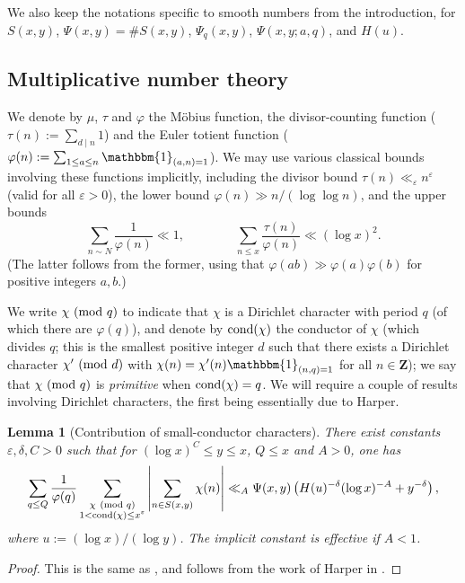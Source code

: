 \documentclass[reqno,11pt]{amsart}
\newtheorem{lemma}[theorem]{Lemma}
\theoremstyle{definition}
\theoremstyle{remark}
\numberwithin{equation}{section}
\newcommand{\Z}{\mathbf{Z}}
\newcommand{\one}{\mathbbm{1}}
\newcommand{\eps}{\varepsilon}
\newcommand{\cond}{\textnormal{cond}}
\renewcommand{\pmod}[1]{\ (\textnormal{mod } #1)}
\begin{document}
We also keep the notations specific to smooth numbers from the introduction, for $S(x, y)$, $\Psi(x, y) = \# S(x, y)$, $\Psi_q(x, y)$, $\Psi(x, y; a, q)$, and $H(u)$.


\subsection{Multiplicative number theory}

We denote by $\mu$, $\tau$ and $\varphi$ the M\"obius function, the divisor-counting function ($\tau(n) := \sum_{d \mid n} 1$) and the Euler totient function ($\varphi(n) := \sum_{1 \le a \le n} \one_{(a, n) = 1}$). We may use various classical bounds involving these functions implicitly, including the divisor bound $\tau(n) \ll_\eps n^\eps$ (valid for all $\eps > 0$), the lower bound $\varphi(n) \gg n/(\log \log n)$, and the upper bounds
\[
    \sum_{n \sim N} \frac{1}{\varphi(n)} \ll 1, \qquad\qquad 
    \sum_{n \le x} \frac{\tau(n)}{\varphi(n)} \ll (\log x)^2.
\]
(The latter follows from the former, using that $\varphi(ab) \gg \varphi(a) \varphi(b)$ for positive integers $a, b$.)

We write $\chi \pmod{q}$ to indicate that $\chi$ is a Dirichlet character with period $q$ (of which there are $\varphi(q)$), and denote by $\cond(\chi)$ the conductor of $\chi$ (which divides $q$; this is the smallest positive integer $d$ such that there exists a Dirichlet character $\chi' \pmod{d}$ with $\chi(n) = \chi'(n) \one_{(n, q) = 1}$ for all $n \in \Z$); we say that $\chi \pmod{q}$ is \emph{primitive} when $\cond(\chi) = q$. We will require a couple of results involving Dirichlet characters, the first being essentially due to Harper.

\begin{lemma}[Contribution of small-conductor characters] \label{lem:harper}
There exist constants $\eps, \delta, C > 0$ such that for $(\log x)^C \le y \le x$, $Q \le x$ and $A > 0$, one has
\[
    \sum_{q \le Q} \frac{1}{\varphi(q)} \sum_{\substack{\chi \pmod{q} \\ 1 < \cond(\chi) \le x^\eps}} 
    \left\vert \sum_{n \in S(x, y)} \chi(n) \right\vert \ll_A 
    \Psi(x, y) 
    \left(H(u)^{-\delta} (\log x)^{-A} + y^{-\delta} \right),
\]
where $u := (\log x)/(\log y)$. The implicit constant is effective if $A < 1$.
\end{lemma}

\begin{proof}
This is the same as \cite[Lemme 5]{drappeau2015theoremes}, and follows from the work of Harper in \cite[\S 3.3]{harper2012bombieri}.
\end{proof}
\end{document}
